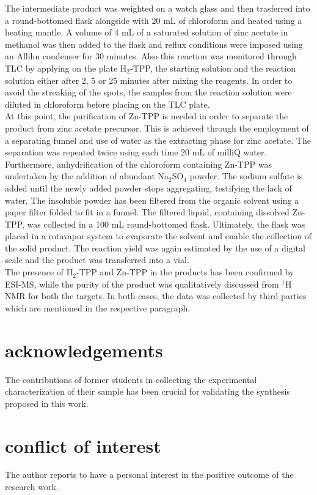 \documentclass[num-refs]{wiley-article}
\begin{document}
The intermediate product was weighted on a watch glass and then trasferred into a round-bottomed flask alongside with 20 mL of chloroform and heated using a heating mantle.
A volume of 4 mL of a saturated solution of zinc acetate in methanol was then added to the flask and reflux conditions were imposed using an Allihn condenser for 30 minutes.
Also this reaction was monitored through TLC by applying on the plate H$_{2}$-TPP, the starting solution and the reaction solution either after 2, 5 or 25 minutes after mixing the reagents.
In order to avoid the streaking of the spots, the samples from the reaction solution were diluted in chloroform before placing on the TLC plate.\\
\break
At this point, the purification of Zn-TPP is needed in order to separate the product from zinc acetate precursor.
This is achieved through the employment of a separating funnel and use of water as the extracting phase for zinc acetate.
The separation was repeated twice using each time 20 mL of milliQ water.
Furthermore, anhydrification of the chloroform containing Zn-TPP was undertaken by the addition of abundant Na$_{2}$SO$_{4}$ powder.
The sodium sulfate is added until the newly added powder stops aggregating, testifying the lack of water.
The insoluble powder has been filtered from the organic solvent using a paper filter folded to fit in a funnel.
The filtered liquid, containing dissolved Zn-TPP, was collected in a 100 mL round-bottomed flask.
Ultimately, the flask was placed in a rotavapor system to evaporate the solvent and enable the collection of the solid product.
The reaction yield was again estimated by the use of a digital scale and the product was transferred into a vial.\\
The presence of H$_{2}$-TPP and Zn-TPP in the products has been confirmed by ESI-MS, while the purity of the product was qualitatively discussed from $^{1}$H NMR for both the targets.
In both cases, the data was collected by third parties which are mentioned in the respective paragraph.

\section*{acknowledgements}
The contributions of former students in collecting the experimental characterization of their sample has been crucial for validating the synthesis proposed in this work.
\section*{conflict of interest}
The author reports to have a personal interest in the positive outcome of the research work.
\end{document}
